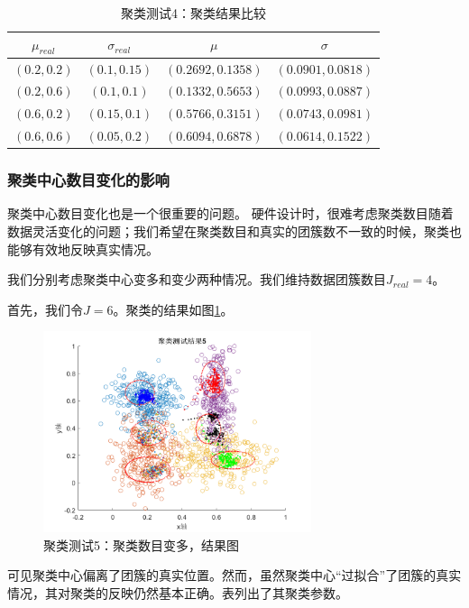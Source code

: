 \begin{table}[htbp]
\centering
\begin{tabular}{c|c||c|c}
  \hline
  $\mu_{real}$   &  $\sigma_{real}$ &  $\mu$  &   $\sigma$\\
  \hline
  $(0.2,0.2)$    &  $(0.1,0.15)$   &  $(0.2692, 0.1358)$  & $(0.0901, 0.0818)$ \\
  $(0.2,0.6)$    &  $(0.1,0.1)$   &  $(0.1332, 0.5653)$  & $(0.0993, 0.0887)$ \\
  $(0.6,0.2)$    &  $(0.15,0.1)$   &  $(0.5766, 0.3151)$  & $(0.0743, 0.0981)$ \\
  $(0.6,0.6)$    &  $(0.05,0.2)$   &  $(0.6094, 0.6878)$  & $(0.0614, 0.1522)$ \\
  \hline
\end{tabular}
\caption{聚类测试4：聚类结果比较}
\label{tab:clustest4}
\end{table}

\subsubsection{聚类中心数目变化的影响}
聚类中心数目变化也是一个很重要的问题。 硬件设计时，很难考虑聚类数目随着数据灵活变化的问题；我们希望在聚类数目和真实的团簇数不一致的时候，聚类也能够有效地反映真实情况。

我们分别考虑聚类中心变多和变少两种情况。我们维持数据团簇数目$J_{real}=4$。

首先，我们令$J = 6$。聚类的结果如图\ref{fig:clustest5re}。

\begin{figure}[htbp]
   \centering
   \includegraphics[width=0.7\textwidth]{ClusterTest5Result.png} %
   \caption{聚类测试5：聚类数目变多，结果图}
   \label{fig:clustest5re}
\end{figure}

可见聚类中心偏离了团簇的真实位置。然而，虽然聚类中心“过拟合”了团簇的真实情况，其对聚类的反映仍然基本正确。表列出了其聚类参数。

